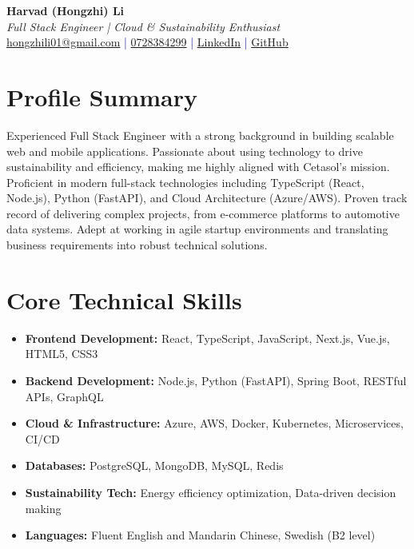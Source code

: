 \documentclass[11pt,a4paper]{article}
\begin{document}
\pagestyle{empty} %

\begin{center}
{\LARGE \textbf{Harvad (Hongzhi) Li}}\\[10pt]
{\Large \textit{Full Stack Engineer | Cloud & Sustainability Enthusiast}}\\[10pt]
\textcolor{darkblue}{\href{mailto:hongzhili01@gmail.com}{hongzhili01@gmail.com} | \href{tel:0728384299}{0728384299} | \href{https://www.linkedin.com/in/harvad/}{LinkedIn} | \href{https://github.com/bluehawana}{GitHub}}
\end{center}

\section*{Profile Summary}
Experienced Full Stack Engineer with a strong background in building scalable web and mobile applications. Passionate about using technology to drive sustainability and efficiency, making me highly aligned with Cetasol's mission. Proficient in modern full-stack technologies including TypeScript (React, Node.js), Python (FastAPI), and Cloud Architecture (Azure/AWS). Proven track record of delivering complex projects, from e-commerce platforms to automotive data systems. Adept at working in agile startup environments and translating business requirements into robust technical solutions.

\section*{Core Technical Skills}
\begin{itemize}[noitemsep]
\item \textbf{Frontend Development:} React, TypeScript, JavaScript, Next.js, Vue.js, HTML5, CSS3
\item \textbf{Backend Development:} Node.js, Python (FastAPI), Spring Boot, RESTful APIs, GraphQL
\item \textbf{Cloud & Infrastructure:} Azure, AWS, Docker, Kubernetes, Microservices, CI/CD
\item \textbf{Databases:} PostgreSQL, MongoDB, MySQL, Redis
\item \textbf{Sustainability Tech:} Energy efficiency optimization, Data-driven decision making
\item \textbf{Languages:} Fluent English and Mandarin Chinese, Swedish (B2 level)
\end{itemize}
\end{document}
